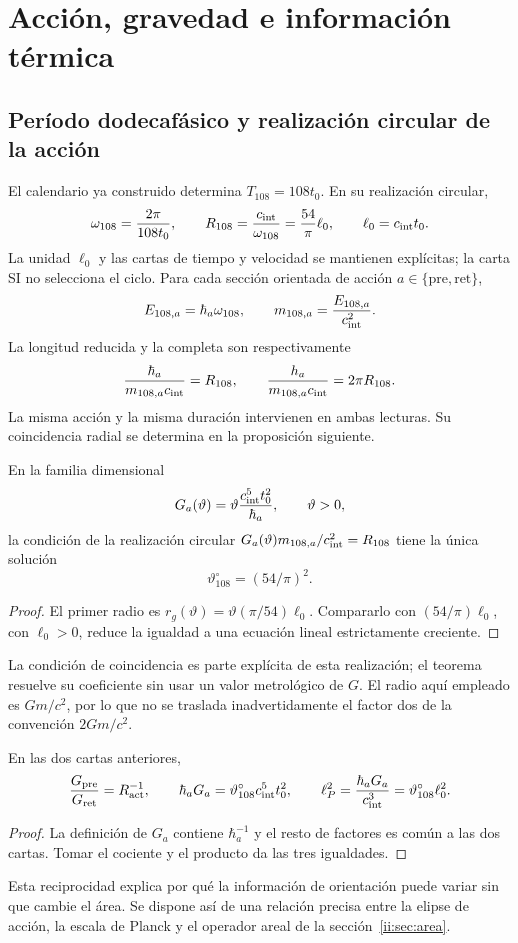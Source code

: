 \section{Acción, gravedad e información térmica}
\label{ii:sec:gravity}
\subsection{Período dodecafásico y realización circular de la acción}
El calendario ya construido determina $T_{108}=108t_0$.
En su realización circular,
\[
\omega_{108}=\frac{2\pi}{108t_0},\qquad
R_{108}=\frac{c_{\rm int}}{\omega_{108}}
=\frac{54}{\pi}\ell_0,\qquad \ell_0=c_{\rm int}t_0.
\]
La unidad $\ell_0$ y las cartas de tiempo y velocidad se mantienen
explícitas; la carta SI no selecciona el ciclo.
Para cada sección orientada de acción $a\in\{\mathrm{pre},\mathrm{ret}\}$,
\[
E_{108,a}=\hbar_a\omega_{108},\qquad
m_{108,a}=\frac{E_{108,a}}{c_{\rm int}^2}.
\]
La longitud reducida y la completa son respectivamente
\[
\frac{\hbar_a}{m_{108,a}c_{\rm int}}=R_{108},
\qquad
\frac{h_a}{m_{108,a}c_{\rm int}}=2\pi R_{108}.
\]
La misma acción y la misma duración intervienen en ambas lecturas. Su coincidencia radial se determina en la proposición siguiente.

\begin{proposition}
En la familia dimensional
\[
G_a(\vartheta)=\vartheta\frac{c_{\rm int}^5t_0^2}{\hbar_a},
\qquad \vartheta>0,
\]
la condición de la realización circular
$G_a(\vartheta)m_{108,a}/c_{\rm int}^2=R_{108}$
tiene la única solución
\[
\vartheta^\circ_{108}=(54/\pi)^2.
\]
\end{proposition}
\begin{proof}
El primer radio es
$r_g(\vartheta)=\vartheta(\pi/54)\ell_0$.
Compararlo con $(54/\pi)\ell_0$, con $\ell_0>0$, reduce la
igualdad a una ecuación lineal estrictamente creciente.
\end{proof}
La condición de coincidencia es parte explícita de esta realización;
el teorema resuelve su coeficiente sin usar un valor metrológico de $G$.
El radio aquí empleado es $Gm/c^2$, por lo que no se traslada
inadvertidamente el factor dos de la convención $2Gm/c^2$.

\begin{proposition}
En las dos cartas anteriores,
\[
\frac{G_{\rm pre}}{G_{\rm ret}}=R_{\rm act}^{-1},\qquad
\hbar_aG_a=\vartheta^\circ_{108}c_{\rm int}^5t_0^2,
\qquad
\ell_P^2=\frac{\hbar_aG_a}{c_{\rm int}^3}
=\vartheta^\circ_{108}\ell_0^2.
\]
\end{proposition}
\begin{proof}
La definición de $G_a$ contiene $\hbar_a^{-1}$ y el resto de factores
es común a las dos cartas. Tomar el cociente y el producto da
las tres igualdades.
\end{proof}
Esta reciprocidad explica por qué la información de orientación puede
variar sin que cambie el área. Se dispone así de una relación precisa
entre la elipse de acción, la escala de Planck y el operador areal
de la sección~\ref{ii:sec:area}.

